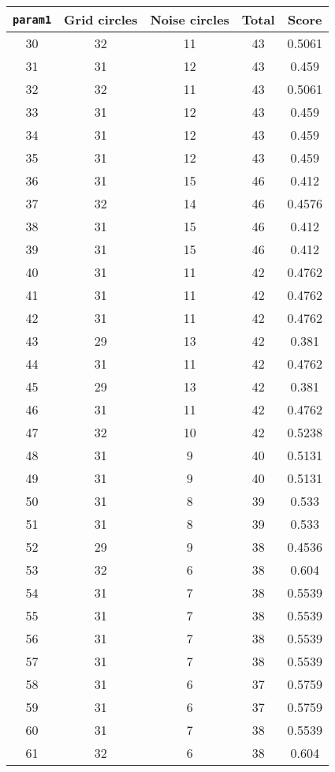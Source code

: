 \documentclass[letterpaper, 12pt]{article}
\begin{document}
\begin{longtable}{|c|c|c|c|c|}
\hline
\textbf{\texttt{param1}} & \textbf{Grid circles} & \textbf{Noise circles} & \textbf{Total} & \textbf{Score} \\
\hline
30 & 32 & 11 & 43 & 0.5061 \\
\hline
31 & 31 & 12 & 43 & 0.459 \\
\hline
32 & 32 & 11 & 43 & 0.5061 \\
\hline
33 & 31 & 12 & 43 & 0.459 \\
\hline
34 & 31 & 12 & 43 & 0.459 \\
\hline
35 & 31 & 12 & 43 & 0.459 \\
\hline
36 & 31 & 15 & 46 & 0.412 \\
\hline
37 & 32 & 14 & 46 & 0.4576 \\
\hline
38 & 31 & 15 & 46 & 0.412 \\
\hline
39 & 31 & 15 & 46 & 0.412 \\
\hline
40 & 31 & 11 & 42 & 0.4762 \\
\hline
41 & 31 & 11 & 42 & 0.4762 \\
\hline
42 & 31 & 11 & 42 & 0.4762 \\
\hline
43 & 29 & 13 & 42 & 0.381 \\
\hline
44 & 31 & 11 & 42 & 0.4762 \\
\hline
45 & 29 & 13 & 42 & 0.381 \\
\hline
46 & 31 & 11 & 42 & 0.4762 \\
\hline
47 & 32 & 10 & 42 & 0.5238 \\
\hline
48 & 31 & 9 & 40 & 0.5131 \\
\hline
49 & 31 & 9 & 40 & 0.5131 \\
\hline
50 & 31 & 8 & 39 & 0.533 \\
\hline
51 & 31 & 8 & 39 & 0.533 \\
\hline
52 & 29 & 9 & 38 & 0.4536 \\
\hline
53 & 32 & 6 & 38 & 0.604 \\
\hline
54 & 31 & 7 & 38 & 0.5539 \\
\hline
55 & 31 & 7 & 38 & 0.5539 \\
\hline
56 & 31 & 7 & 38 & 0.5539 \\
\hline
57 & 31 & 7 & 38 & 0.5539 \\
\hline
58 & 31 & 6 & 37 & 0.5759 \\
\hline
59 & 31 & 6 & 37 & 0.5759 \\
\hline
60 & 31 & 7 & 38 & 0.5539 \\
\hline
61 & 32 & 6 & 38 & 0.604 \\

\end{longtable}
\end{document}
